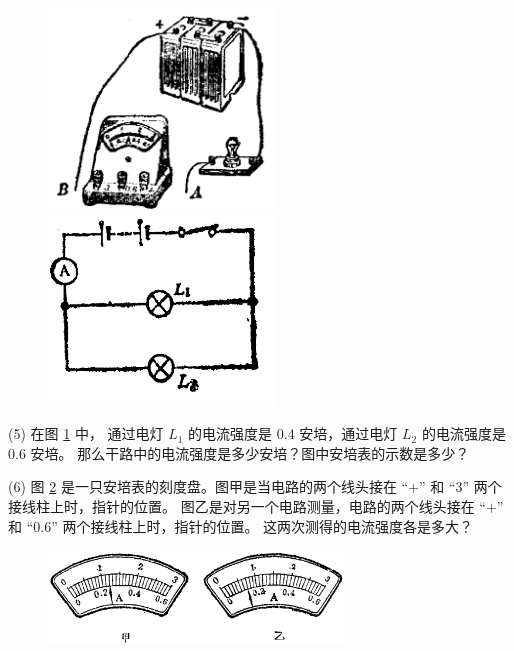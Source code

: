 \begin{figure}[htbp]
    \centering
    \begin{minipage}{7cm}
    \centering
    \includegraphics[width=6cm]{../pic/czwl2-ch8-5}
    \caption{}\label{fig:8-5}
    \end{minipage}
    \qquad
    \begin{minipage}{7cm}
    \centering
    \includegraphics[width=6cm]{../pic/czwl2-ch8-6}
    \caption{}\label{fig:8-6}
    \end{minipage}
\end{figure}

(5) 在图 \ref{fig:8-6} 中， 通过电灯 $L_1$ 的电流强度是 0.4 安培，通过电灯 $L_2$ 的电流强度是 0.6 安培。
那么干路中的电流强度是多少安培？图中安培表的示数是多少？

(6) 图 \ref{fig:8-7} 是一只安培表的刻度盘。图甲是当电路的两个线头接在 “$+$” 和 “3” 两个接线柱上时，指针的位置。
图乙是对另一个电路测量，电路的两个线头接在 “$+$” 和 “0.6” 两个接线柱上时，指针的位置。
这两次测得的电流强度各是多大？

\begin{figure}[htbp]
    \centering
    \includegraphics[width=0.7\textwidth]{../pic/czwl2-ch8-7}
    \caption{}\label{fig:8-7}
\end{figure}

